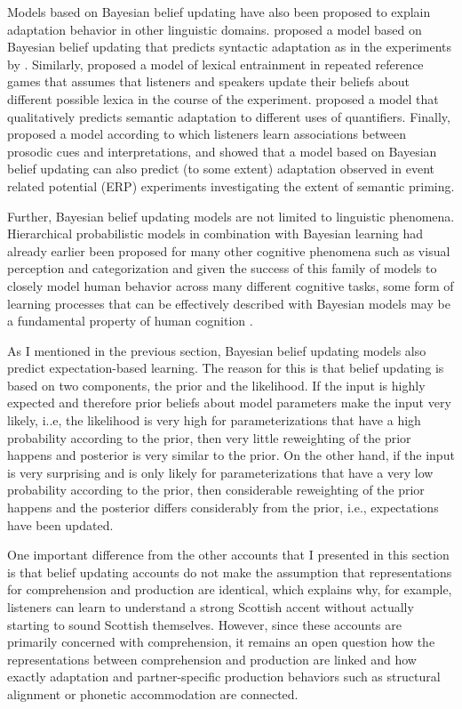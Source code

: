 Models based on Bayesian belief updating have also been proposed to explain adaptation behavior in other linguistic domains. \textcite{Kleinschmidt2012} proposed a model based on Bayesian belief updating that predicts syntactic adaptation as in the experiments by \textcite{Fine2013}. Similarly, \textcite{Hawkins2017} proposed a model of lexical entrainment in repeated reference games that assumes that listeners and speakers update their beliefs about different possible lexica in the course of the experiment. \textcite{Qing2014} proposed a model that qualitatively predicts semantic adaptation to different uses of quantifiers. Finally, \textcite{Roettger2019} proposed a model according to which listeners learn associations between prosodic cues and interpretations, and \textcite{DelaneyBusch2019} showed that a model based on Bayesian belief updating can also predict (to some extent) adaptation observed in event related potential (ERP) experiments investigating the extent of semantic priming.

Further, Bayesian belief updating models are not limited to linguistic phenomena. Hierarchical probabilistic models in combination with Bayesian learning 
had already earlier been proposed for many other cognitive phenomena such as visual perception  and categorization 
and given the success of this family of models to closely model human behavior across many different cognitive tasks, some form of learning processes that can 
be effectively described with Bayesian models may be a fundamental property of human cognition .

As I mentioned in the previous section, Bayesian belief updating models also predict expectation-based learning. The reason for this is that belief updating is based on 
two components, the prior and the likelihood. If the input is highly expected and therefore prior beliefs about model parameters make the input very likely, 
i..e, the likelihood is very high for parameterizations that have a high probability according to the prior, then very little reweighting of the prior happens
and posterior is very similar to the prior. On the other hand, if the input is very surprising and  is only likely for parameterizations that have a very low 
probability according to the prior, then considerable reweighting of the prior happens and the posterior differs considerably from the prior, i.e., expectations have been updated.
 
One important difference from the other accounts that I presented in this section is that belief updating accounts do not make the assumption that representations
for comprehension and production are identical, which explains why, for example, listeners can learn to understand a strong Scottish accent without actually starting to sound Scottish themselves.
However, since these accounts are primarily concerned with comprehension, it remains an open question how the representations between
comprehension and production are linked and how exactly adaptation and partner-specific production behaviors such as structural alignment or phonetic accommodation are connected.


